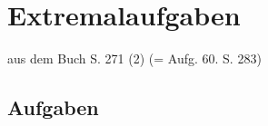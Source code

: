 
\section{Extremalaufgaben}

 aus dem Buch S. 271 (2) (= Aufg. 60. S. 283)

\TNTeop{}


\subsection*{Aufgaben}

\newpage
